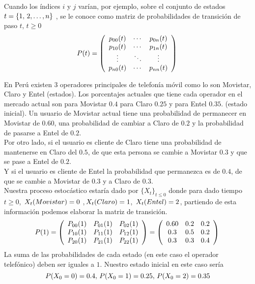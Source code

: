 Cuando los índices $i$ y $j$ varían, por ejemplo, sobre el conjunto de estados $t=\{ 1,\thinspace 2,\ldots, n\}$ , se le conoce como matriz de probabilidades de transición de paso $t$, $t\geq 0$
$$P(t)=\left( \begin{array}{ccc}
p_{0 0}(t) & \cdots & p_{0 n}(t) \\ 
p_{1 0}(t) & \cdots & p_{1 n}(t)\\
\vdots & \ddots & \vdots \\
p_{n 0}(t) & \cdots & p_{n n}(t) 
\end{array}\right)\\$$
\begin{Ejm}
    En Perú existen $3$ operadores principales de telefonía móvil como lo son Movistar, Claro y Entel (estados).
    Los porcentajes actuales que tiene cada operador en el mercado actual son para Movistar $0.4$ para Claro $0.25$ y para Entel $0.35$. (estado inicial).
    Un usuario de Movistar actual tiene una probabilidad de permanecer en Movistar de $0.60$, una probabilidad de cambiar a Claro de $0.2$ y la probabilidad de pasarse a Entel de $0.2$.\\Por otro lado, si el usuario es cliente de Claro tiene una probabilidad de mantenerse en Claro del $0.5$, de que esta persona se cambie a Movistar  $0.3$ y que se pase a Entel de $0.2$.\\Y si el usuario es cliente de Entel la probabilidad que permanezca es de $0.4$, de que se cambie a Movistar de $0.3$ y a Claro de $0.3$.\\
    Nuestra proceso estocástico estaría dado por $\{X_t\}_{t\leq 0}$ donde para dado tiempo $t\geq 0$, $\thinspace X_t(Movistar)=0$ ,$\thinspace X_t(Claro)=1$, $\thinspace X_t(Entel)=2$, partiendo de esta información podemos elaborar la matriz de transición.
   $$P(1)=\left( \begin{array}{ccc}
    P_{0 0}(1) & P_{0 1}(1) & P_{0 2}(1) \\
    P_{1 0}(1) & P_{1 1}(1) & P_{1 2}(1) \\
    P_{2 0}(1) & P_{2 1}(1) & P_{2 2}(1)  
    \end{array}\right)=
    \left( \begin{array}{ccc}
    0.60 & 0.2 & 0.2 \\ 
    0.3 & 0.5 & 0.2 \\
    0.3 & 0.3 & 0.4
    \end{array}\right)\\$$
    La suma de las probabilidades de cada estado (en este caso el operador telefónico) deben ser iguales a $1$. Nuestro estado inicial en este caso sería $$P(X_0 = 0)= 0.4,\thinspace P(X_0 = 1)= 0.25 ,\thinspace P(X_0 = 2)= 0.35$$

\end{Ejm}
